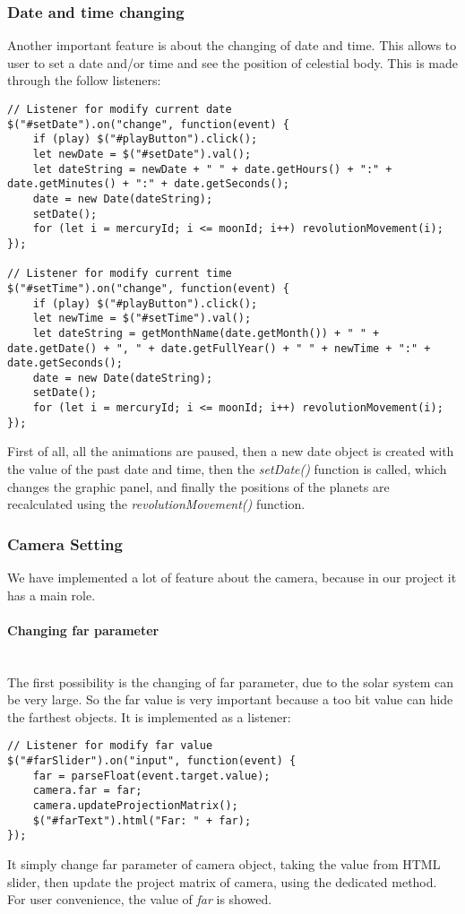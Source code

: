 \documentclass{article}
\begin{document}
\subsubsection{Date and time changing} 
Another important feature is about the changing of date and time. This allows to user to set a date and/or time and see the position of celestial body. This is made through the follow listeners:
\begin{lstlisting}
// Listener for modify current date
$("#setDate").on("change", function(event) {
	if (play) $("#playButton").click();
	let newDate = $("#setDate").val();
	let dateString = newDate + " " + date.getHours() + ":" + date.getMinutes() + ":" + date.getSeconds();
	date = new Date(dateString);
	setDate();
	for (let i = mercuryId; i <= moonId; i++) revolutionMovement(i);
});

// Listener for modify current time
$("#setTime").on("change", function(event) {
	if (play) $("#playButton").click();
	let newTime = $("#setTime").val();
	let dateString = getMonthName(date.getMonth()) + " " + date.getDate() + ", " + date.getFullYear() + " " + newTime + ":" + date.getSeconds();
	date = new Date(dateString);
	setDate();
	for (let i = mercuryId; i <= moonId; i++) revolutionMovement(i);
});
\end{lstlisting}
First of all, all the animations are paused, then a new date object is created with the value of the past date and time, then the \textit{setDate()} function is called, which changes the graphic panel, and finally the positions of the planets are recalculated using the \textit{revolutionMovement()} function.

\subsubsection{Camera Setting}
We have implemented a lot of feature about the camera, because in our project it has a main role.
\paragraph{Changing far parameter}\mbox{}\\
The first possibility is the changing of far parameter, due to the solar system can be very large. So the far value is very important because a too bit value can hide the farthest objects. It is implemented as a listener:
\begin{lstlisting}
// Listener for modify far value
$("#farSlider").on("input", function(event) {
	far = parseFloat(event.target.value);
	camera.far = far;
	camera.updateProjectionMatrix();
	$("#farText").html("Far: " + far);
});
\end{lstlisting}
It simply change far parameter of camera object, taking the value from HTML slider, then update the project matrix of camera, using the dedicated method. For user convenience, the value of \textit{far} is showed.
\end{document}
